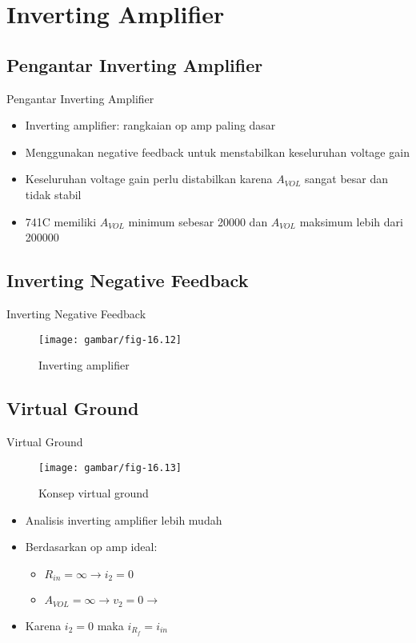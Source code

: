 \section{Inverting Amplifier}
\subsection{Pengantar Inverting Amplifier}
\begin{frame}{Pengantar Inverting Amplifier}
	\begin{itemize}
		\item Inverting amplifier: rangkaian op amp paling dasar
		\item Menggunakan negative feedback untuk menstabilkan keseluruhan voltage gain
		\item Keseluruhan voltage gain perlu distabilkan karena $ A_{VOL} $ sangat besar dan tidak stabil
		\item 741C memiliki $ A_{VOL} $ minimum sebesar 20000 dan $ A_{VOL} $ maksimum lebih dari 200000
	\end{itemize}
\end{frame}

\subsection{Inverting Negative Feedback}
\begin{frame}{Inverting Negative Feedback}
	\begin{figure}
		\centering
		\texttt{[image: gambar/fig-16.12]}
		\caption{Inverting amplifier}
		\label{fig-16.12}
	\end{figure}
\end{frame}

\subsection{Virtual Ground}
\begin{frame}{Virtual Ground}
	\begin{multicols}{2}
		\begin{figure}
			\centering
			\texttt{[image: gambar/fig-16.13]}
			\caption{Konsep virtual ground}
			\label{fig-16.13}
		\end{figure}
	\columnbreak
		\begin{itemize}
			\item Analisis inverting amplifier lebih mudah
			\item Berdasarkan op amp ideal:
			\begin{itemize}
				\item $ R_{in} = \infty \rightarrow i_2 = 0$
				\item $ A_{VOL} = \infty \rightarrow v_2 = 0 \rightarrow $
			\end{itemize}
			\item Karena $ i_2 = 0 $ maka $ i_{R_f} = i_{in} $
		\end{itemize}
	\end{multicols}
\end{frame}

